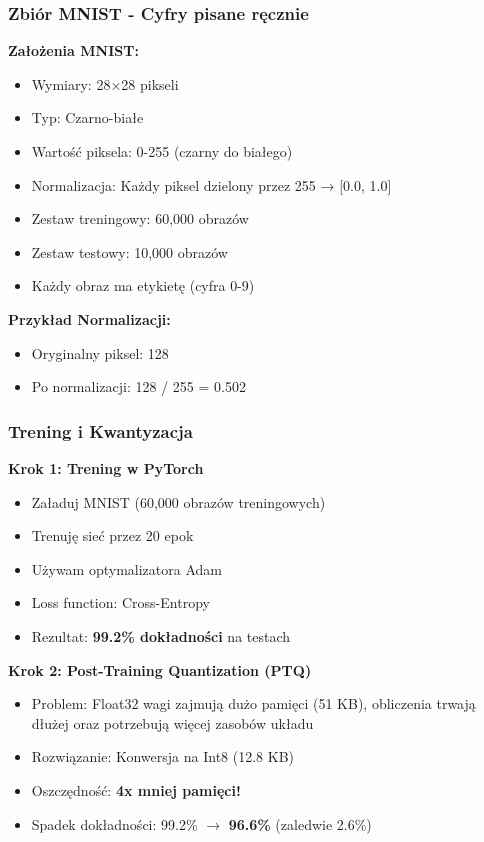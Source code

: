 \documentclass{beamer}
\begin{document}
\begin{frame}
  \frametitle{Zbiór MNIST - Cyfry pisane ręcznie}

  \textbf{Założenia MNIST:}
  \begin{itemize}
    \item Wymiary: 28×28 pikseli
    \item Typ: Czarno-białe 
    \item Wartość piksela: 0-255 (czarny do białego)
    \item Normalizacja: Każdy piksel dzielony przez 255 → [0.0, 1.0]
    \item Zestaw treningowy: 60,000 obrazów
    \item Zestaw testowy: 10,000 obrazów
    \item Każdy obraz ma etykietę (cyfra 0-9)
  \end{itemize}

  \vspace{0.3cm}

  \textbf{Przykład Normalizacji:}
  \begin{itemize}
    \item Oryginalny piksel: 128
    \item Po normalizacji: 128 / 255 = 0.502
  \end{itemize}
\end{frame}

\begin{frame}
  \frametitle{Trening i Kwantyzacja}

  \textbf{Krok 1: Trening w PyTorch}
  \begin{itemize}
    \item Załaduj MNIST (60,000 obrazów treningowych)
    \item Trenuję sieć przez 20 epok
    \item Używam optymalizatora Adam
    \item Loss function: Cross-Entropy
    \item Rezultat: \textbf{99.2\% dokładności} na testach
  \end{itemize}

  \vspace{0.3cm}

  \textbf{Krok 2: Post-Training Quantization (PTQ)}
  \begin{itemize}
    \item Problem: Float32 wagi zajmują dużo pamięci (51 KB), obliczenia trwają dłużej oraz potrzebują więcej zasobów układu
    \item Rozwiązanie: Konwersja na Int8 (12.8 KB)
    \item Oszczędność: \textbf{4x mniej pamięci!}
    \item Spadek dokładności: 99.2\% $\rightarrow$ \textbf{96.6\%} (zaledwie 2.6\%)
  \end{itemize}
\end{frame}
\end{document}
